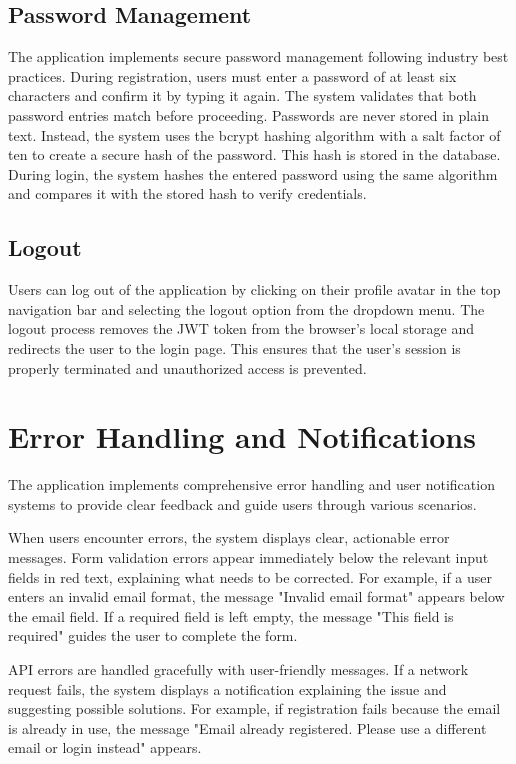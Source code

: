 \subsection{Password Management}

The application implements secure password management following industry best practices. During registration, users must enter a password of at least six characters and confirm it by typing it again. The system validates that both password entries match before proceeding. Passwords are never stored in plain text. Instead, the system uses the bcrypt hashing algorithm with a salt factor of ten to create a secure hash of the password. This hash is stored in the database. During login, the system hashes the entered password using the same algorithm and compares it with the stored hash to verify credentials.

\subsection{Logout}

Users can log out of the application by clicking on their profile avatar in the top navigation bar and selecting the logout option from the dropdown menu. The logout process removes the JWT token from the browser's local storage and redirects the user to the login page. This ensures that the user's session is properly terminated and unauthorized access is prevented.

\section{Error Handling and Notifications}

The application implements comprehensive error handling and user notification systems to provide clear feedback and guide users through various scenarios.

When users encounter errors, the system displays clear, actionable error messages. Form validation errors appear immediately below the relevant input fields in red text, explaining what needs to be corrected. For example, if a user enters an invalid email format, the message "Invalid email format" appears below the email field. If a required field is left empty, the message "This field is required" guides the user to complete the form.

API errors are handled gracefully with user-friendly messages. If a network request fails, the system displays a notification explaining the issue and suggesting possible solutions. For example, if registration fails because the email is already in use, the message "Email already registered. Please use a different email or login instead" appears.

